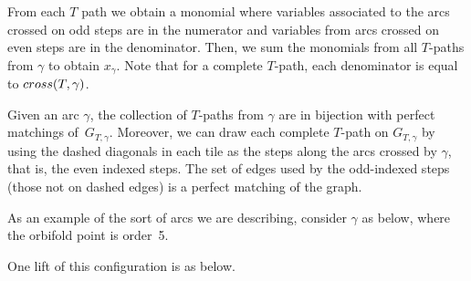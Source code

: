 \documentclass[11pt]{article}
\numberwithin{equation}{section}
\begin{document}
From each $T$ path we obtain a monomial where variables associated to the arcs crossed on odd steps are in the numerator and variables from arcs crossed on even steps are in the denominator. Then, we sum the monomials from all $T$-paths from $\gamma$ to obtain $x_\gamma$. Note that for a complete $T$-path, each denominator is equal to ${\rm cross}(T,\gamma)$.

Given an arc $\gamma$, the collection of $T$-paths from $\gamma$ are in bijection with perfect matchings of~$G_{T,\gamma}$. Moreover, we can draw each complete $T$-path on $G_{T,\gamma}$ by using the dashed diagonals in each tile as the steps along the arcs crossed by $\gamma$, that is, the even indexed steps. The set of edges used by the odd-indexed steps (those not on dashed edges) is a perfect matching of the graph.

As an example of the sort of arcs we are describing, consider $\gamma$ as below, where the orbifold point is order~5.

\begin{center}
\end{center}

One lift of this configuration is as below.
\end{document}
